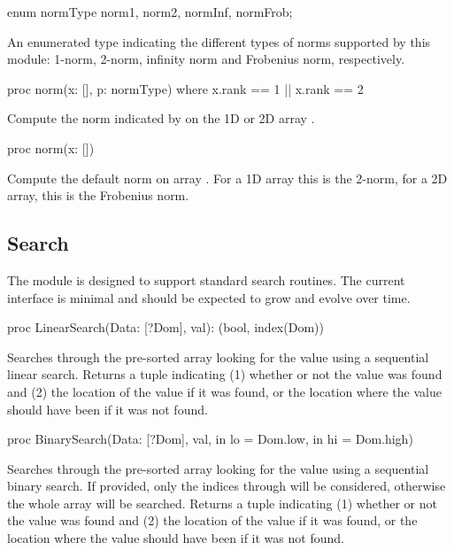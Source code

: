 \begin{protohead}
enum normType {norm1, norm2, normInf, normFrob};
\end{protohead}
\begin{protobody}
An enumerated type indicating the different types of norms supported
by this module: 1-norm, 2-norm, infinity norm and Frobenius norm,
respectively.
\end{protobody}

\begin{protohead}
proc norm(x: [], p: normType) where x.rank == 1 || x.rank == 2
\end{protohead}
\begin{protobody}
Compute the norm indicated by  on the 1D or 2D array .
\end{protobody}

\begin{protohead}
proc norm(x: [])
\end{protohead}
\begin{protobody}
Compute the default norm on array .  For a 1D array this is
the 2-norm, for a 2D array, this is the Frobenius norm.
\end{protobody}


\subsection{Search}
\label{Search}

The  module is designed to support standard search
routines.  The current interface is minimal and should be expected to
grow and evolve over time.

\begin{protohead}
proc LinearSearch(Data: [?Dom], val): (bool, index(Dom))
\end{protohead}
\begin{protobody}
Searches through the pre-sorted array  looking for the
value  using a sequential linear search.  Returns a tuple
indicating (1) whether or not the value was found and (2) the location
of the value if it was found, or the location where the value should
have been if it was not found.
\end{protobody}

\begin{protohead}
proc BinarySearch(Data: [?Dom], val, in lo = Dom.low, in hi = Dom.high)
\end{protohead}
\begin{protobody}
Searches through the pre-sorted array  looking for the
value  using a sequential binary search.  If provided, only
the indices  through  will be considered, otherwise
the whole array will be searched.  Returns a tuple indicating (1)
whether or not the value was found and (2) the location of the value
if it was found, or the location where the value should have been if
it was not found.
\end{protobody}


